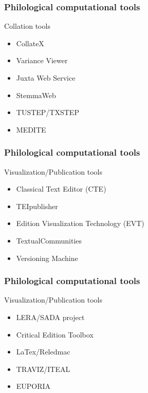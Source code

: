 \begin{frame}
	\frametitle{Philological computational tools}
	\addtocounter{nframe}{1}
    \begin{block}{Collation tools}
		\begin{itemize}
			\item CollateX
			\item Variance Viewer
			\item Juxta Web Service
			\item StemmaWeb
			\item TUSTEP/TXSTEP
			\item MEDITE
		\end{itemize}
	\end{block}
\end{frame}

\begin{frame}
	\frametitle{Philological computational tools}
	\addtocounter{nframe}{1}
    \begin{block}{Visualization/Publication tools}
		\begin{itemize}
			\item Classical Text Editor (CTE)
			\item TEIpublisher
			\item Edition Visualization Technology (EVT)
			\item TextualCommunities
			\item Versioning Machine
		\end{itemize}
	\end{block}
\end{frame}

\begin{frame}
	\frametitle{Philological computational tools}
	\addtocounter{nframe}{1}
    \begin{block}{Visualization/Publication tools}
		\begin{itemize}
			\item LERA/SADA project
			\item Critical Edition Toolbox
			\item LaTex/Reledmac
			\item TRAVIZ/ITEAL
			\item EUPORIA
		\end{itemize}
	\end{block}
\end{frame}



